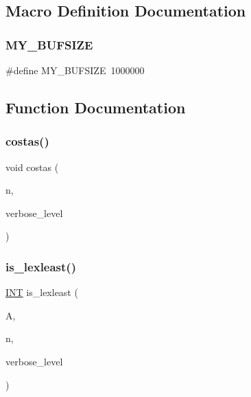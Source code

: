 \subsection{Macro Definition Documentation}
\mbox{\label{costas_8_c_a6079b3b36c54787d2dca2de2fb2c96df}} 
\subsubsection{\texorpdfstring{M\+Y\+\_\+\+B\+U\+F\+S\+I\+ZE}{MY\_BUFSIZE}}
{\footnotesize\ttfamily \#define M\+Y\+\_\+\+B\+U\+F\+S\+I\+ZE~1000000}



\subsection{Function Documentation}
\mbox{\label{costas_8_c_a41b058c10b5e92d11505cd40b1ff6b28}} 
\subsubsection{\texorpdfstring{costas()}{costas()}}
{\footnotesize\ttfamily void costas (\begin{DoxyParamCaption}\item[{\mbox{\hyperlink{galois_8h_a09fddde158a3a20bd2dcadb609de11dc}{I\+NT}}}]{n,  }\item[{\mbox{\hyperlink{galois_8h_a09fddde158a3a20bd2dcadb609de11dc}{I\+NT}}}]{verbose\+\_\+level }\end{DoxyParamCaption})}

\mbox{\label{costas_8_c_af674d0d89086cd0a1be0025dfe5ec16a}} 
\subsubsection{\texorpdfstring{is\+\_\+lexleast()}{is\_lexleast()}}
{\footnotesize\ttfamily \mbox{\hyperlink{galois_8h_a09fddde158a3a20bd2dcadb609de11dc}{I\+NT}} is\+\_\+lexleast (\begin{DoxyParamCaption}\item[{\mbox{\hyperlink{galois_8h_a09fddde158a3a20bd2dcadb609de11dc}{I\+NT}} $\ast$}]{A,  }\item[{\mbox{\hyperlink{galois_8h_a09fddde158a3a20bd2dcadb609de11dc}{I\+NT}}}]{n,  }\item[{\mbox{\hyperlink{galois_8h_a09fddde158a3a20bd2dcadb609de11dc}{I\+NT}}}]{verbose\+\_\+level }\end{DoxyParamCaption})}

